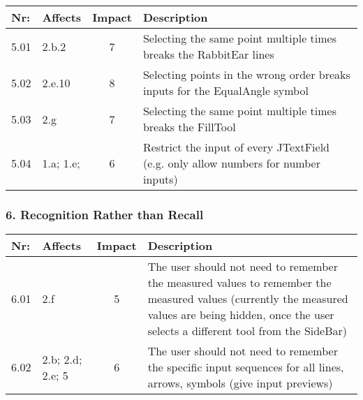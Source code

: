         \begin{tabular}{l | p{} | c | p{}}
        Nr: & Affects & Impact & Description \\ \hline
        5.01 & 2.b.2 & 7 & Selecting the same point multiple times breaks the RabbitEar lines \\ \hline
        5.02 & 2.e.10  & 8 & Selecting points in the wrong order breaks inputs for the EqualAngle symbol \\ \hline 
        5.03 & 2.g & 7 & Selecting the same point multiple times breaks the FillTool \\ \hline
        5.04 & 1.a; 1.e; & 6 & Restrict the input of every JTextField (e.g. only allow numbers for number inputs)\\ \hline
        \end{tabular}

\subsubsection*{6. Recognition Rather than Recall}

        \begin{tabular}{l | p{} | c | p{}}
        Nr: & Affects & Impact & Description \\ \hline
        6.01 & 2.f  & 5 & The user should not need to remember the measured values to remember the measured values (currently the measured values are being hidden, once the user selects a different tool from the SideBar)\\ \hline
        6.02 & 2.b; 2.d; 2.e; 5  & 6 & The user should not need to remember the specific input sequences for all lines, arrows, symbols (give input previews)\\ \hline 
        \end{tabular}


